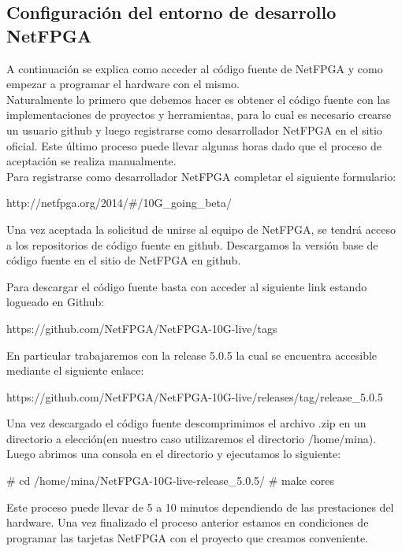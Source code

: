 \subsection{Configuración del entorno de desarrollo NetFPGA}
A continuación se explica como acceder al código fuente de NetFPGA y como empezar a programar el hardware con el mismo.\\

Naturalmente lo primero que debemos hacer es obtener el código fuente con las implementaciones de proyectos y herramientas, para lo cual es necesario crearse un usuario github y luego registrarse como desarrollador NetFPGA en el sitio oficial. Este último proceso puede llevar algunas horas dado que el proceso de aceptación se realiza manualmente.\\

Para registrarse como desarrollador NetFPGA completar el siguiente formulario:

\begin{center}
http://netfpga.org/2014/\#/10G\_going\_beta/
\end{center}

Una vez aceptada la solicitud de unirse al equipo de NetFPGA, se tendrá acceso a los repositorios de código fuente en github. Descargamos la versión base de código fuente en el sitio de NetFPGA en github.

Para descargar el código fuente basta con acceder al siguiente link estando logueado en Github:

\begin{center}
https://github.com/NetFPGA/NetFPGA-10G-live/tags
\end{center}

En particular trabajaremos con la release 5.0.5 la cual se encuentra accesible mediante el siguiente enlace:
 
\begin{center}
https://github.com/NetFPGA/NetFPGA-10G-live/releases/tag/release\_5.0.5
\end{center}

Una vez descargado el código fuente descomprimimos el archivo .zip en un directorio a elección(en nuestro caso utilizaremos el directorio /home/mina). Luego abrimos una consola en el directorio y ejecutamos lo siguiente:

\begin{bash}
# cd /home/mina/NetFPGA-10G-live-release\_5.0.5/
# make cores
\end{bash}

Este proceso puede llevar de 5 a 10 minutos dependiendo de las prestaciones del hardware. Una vez finalizado el proceso anterior estamos en condiciones de programar las tarjetas NetFPGA con el proyecto que creamos conveniente.

